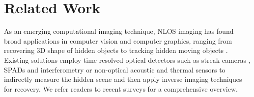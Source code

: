 \documentclass[10pt,journal,compsoc]{IEEEtran}
\begin{document}


\section{Related Work}

As an emerging computational imaging technique, NLOS imaging has found broad applications in computer vision and computer graphics, ranging from recovering 3D shape of hidden objects \cite{2012Velten, 2015Mauro, 2017Tsai, 2018LCT, 2019FK, 2019Liu, 2019Heide, 2020DLCT} to tracking hidden moving objects \cite{2012Velten, 2018Neural, 2019Maeda, 2020Mariko}. Existing solutions employ time-resolved optical detectors such as streak cameras \cite{2012Velten, 2012Gupta}, SPADs \cite{2015Mauro, 2015Gariepy} and interferometry \cite{2015Ioannis, 2019Xin} or non-optical acoustic \cite{2019Lindell} and thermal \cite{2019Maeda} sensors to indirectly measure the hidden scene and then apply inverse imaging techniques for recovery. We refer readers to recent surveys \cite{2017Jarabo, 2018Yoann, 2020Faccio} for a comprehensive overview. 
\end{document}
